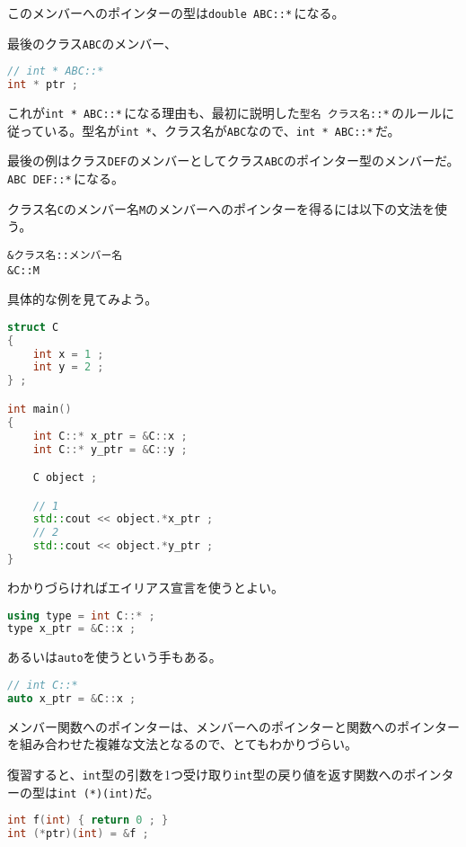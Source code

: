 このメンバーへのポインターの型は\texttt{double ABC::*}\,になる。

最後のクラス\texttt{ABC}のメンバー、
\begin{lstlisting}[language={C++}]
// int * ABC::*
int * ptr ;
\end{lstlisting}
これが\texttt{int * ABC::*}\,になる理由も、最初に説明した\texttt{型名 クラス名::*}\,のルールに従っている。型名が\texttt{int *}、クラス名が\texttt{ABC}なので、\texttt{int * ABC::*}\,だ。

最後の例はクラス\texttt{DEF}のメンバーとしてクラス\texttt{ABC}のポインター型のメンバーだ。\texttt{ABC DEF::*}\,になる。

クラス名\texttt{C}のメンバー名\texttt{M}のメンバーへのポインターを得るには以下の文法を使う。

\begin{lstlisting}[style=grammar]
&クラス名::メンバー名
&C::M
\end{lstlisting}

具体的な例を見てみよう。

\begin{lstlisting}[language={C++}]
struct C
{
    int x = 1 ;
    int y = 2 ;
} ;

int main()
{
    int C::* x_ptr = &C::x ;
    int C::* y_ptr = &C::y ;

    C object ;

    // 1
    std::cout << object.*x_ptr ;
    // 2 
    std::cout << object.*y_ptr ;
}
\end{lstlisting}

わかりづらければエイリアス宣言を使うとよい。

\begin{lstlisting}[language={C++}]
using type = int C::* ;
type x_ptr = &C::x ;
\end{lstlisting}

あるいは\texttt{auto}を使うという手もある。

\ifTombow\pagebreak\fi
\begin{lstlisting}[language={C++}]
// int C::*
auto x_ptr = &C::x ;
\end{lstlisting}

メンバー関数へのポインターは、メンバーへのポインターと関数へのポインターを組み合わせた複雑な文法となるので、とてもわかりづらい。

復習すると、\texttt{int}型の引数を1つ受け取り\texttt{int}型の戻り値を返す関数へのポインターの型は\texttt{int (*)(int)}だ。

\begin{lstlisting}[language={C++}]
int f(int) { return 0 ; }
int (*ptr)(int) = &f ;
\end{lstlisting}

